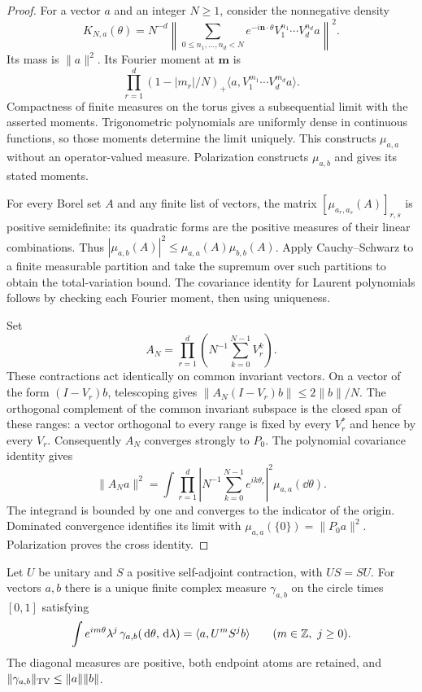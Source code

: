 \begin{proof}
For a vector $a$ and an integer $N\ge1$, consider the nonnegative density
\[
 K_{N,a}(\theta)=N^{-d}
 \left\|\sum_{0\le n_1,\ldots,n_d<N}
 e^{-i\mathbf n\cdot\theta}V_1^{n_1}\cdots V_d^{n_d}a\right\|^2.
\]
Its mass is $\|a\|^2$.  Its Fourier moment at $\mathbf m$ is
\[
 \prod_{r=1}^d(1-|m_r|/N)_+
       \langle a,V_1^{m_1}\cdots V_d^{m_d}a\rangle.
\]
Compactness of finite measures on the torus gives a subsequential
limit with the asserted moments.  Trigonometric polynomials are uniformly
dense in continuous functions, so those moments determine the limit
uniquely.  This constructs $\mu_{a,a}$ without an operator-valued measure.
Polarization constructs $\mu_{a,b}$ and gives its stated moments.

For every Borel set $A$ and any finite list of vectors, the matrix
$[\mu_{a_r,a_s}(A)]_{r,s}$ is positive semidefinite: its quadratic
forms are the positive measures of their linear combinations.
Thus $|\mu_{a,b}(A)|^2\le\mu_{a,a}(A)\mu_{b,b}(A)$.
Apply Cauchy--Schwarz to a finite measurable partition and take the
supremum over such partitions to obtain the total-variation bound.
The covariance identity for Laurent polynomials follows by checking
each Fourier moment, then using uniqueness.

Set
\[
 A_N=\prod_{r=1}^d\left(N^{-1}\sum_{k=0}^{N-1}V_r^k\right).
\]
These contractions act identically on common invariant vectors.
On a vector of the form $(I-V_r)b$, telescoping gives
$\|A_N(I-V_r)b\|\le2\|b\|/N$.
The orthogonal complement of the common invariant subspace is the
closed span of these ranges: a vector orthogonal to every range is
fixed by every $V_r^*$ and hence by every $V_r$.  Consequently $A_N$
converges strongly to $P_0$.  The polynomial covariance identity gives
\[
 \|A_Na\|^2
 =\int\prod_{r=1}^d\left|N^{-1}\sum_{k=0}^{N-1}e^{ik\theta_r}\right|^2
          \mu_{a,a}(\dd\theta).
\]
The integrand is bounded by one and converges to the indicator of the
origin.  Dominated convergence identifies its limit with
$\mu_{a,a}(\{0\})=\|P_0a\|^2$.  Polarization proves the cross identity.
\end{proof}

\begin{lemma}\label{spectra:transfer}
Let $U$ be unitary and $S$ a positive self-adjoint contraction, with
$US=SU$.  For vectors $a,b$ there is a unique finite complex measure
$\gamma_{a,b}$ on the circle times $[0,1]$ satisfying
\[
 \int e^{im\theta}\lambda^j\,\gamma_{a,b}(\,\mathrm d\theta,\,\mathrm d\lambda)
    =\langle a,U^mS^jb\rangle
       \qquad(m\in\mathbb Z,\ j\ge0).
\]
The diagonal measures are positive, both endpoint atoms are retained,
and $\|\gamma_{a,b}\|_{\mathrm{TV}}\le\|a\|\|b\|$.
\end{lemma}

